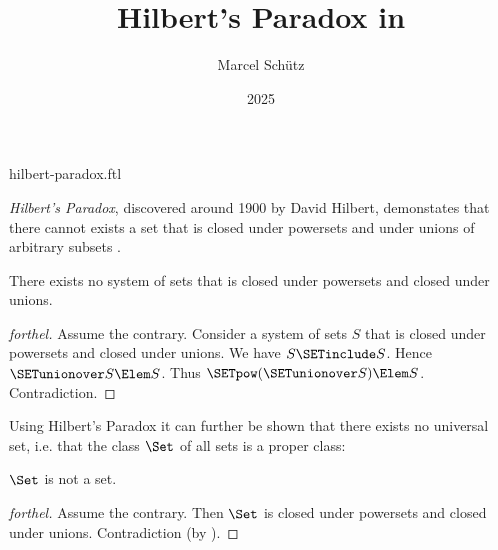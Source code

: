 \documentclass{stex}
\title{Hilbert's Paradox in \Naproche}
\author{Marcel Schütz}
\date{2025}
\begin{document}
\begin{smodule}{hilbert-paradox.ftl}
\maketitle



\noindent \emph{Hilbert's Paradox}, discovered around 1900 by David Hilbert, 
demonstates that there cannot exists a set that is closed under powersets and 
under unions of arbitrary subsets \cite{PeckhausKahl2002}.

\begin{theorem}[forthel,title=Hilbert's Paradox,name=Hilbert Paradox]
  There exists no system of sets that is closed under powersets and closed under unions.
\end{theorem}
\begin{proof}[forthel]
  Assume the contrary.
  Consider a system of sets $S$ that is closed under powersets and closed under unions.
  We have $S \SETinclude S$.
  Hence $\SETunionover S \Elem S$.
  Thus $\SETpow(\SETunionover S) \Elem S$.
  Contradiction.
\end{proof}

\noindent Using Hilbert's Paradox it can further be shown that there exists 
no universal set, i.e. that the class $\Set$ of all sets is a proper class:

\begin{corollary}[forthel]
  $\Set$ is not a set.
\end{corollary}
\begin{proof}[forthel]
  Assume the contrary.
  Then $\Set$ is closed under powersets and closed under unions.
  Contradiction (by ).
\end{proof}

\printbibliography
{}
\end{smodule}
\end{document}

